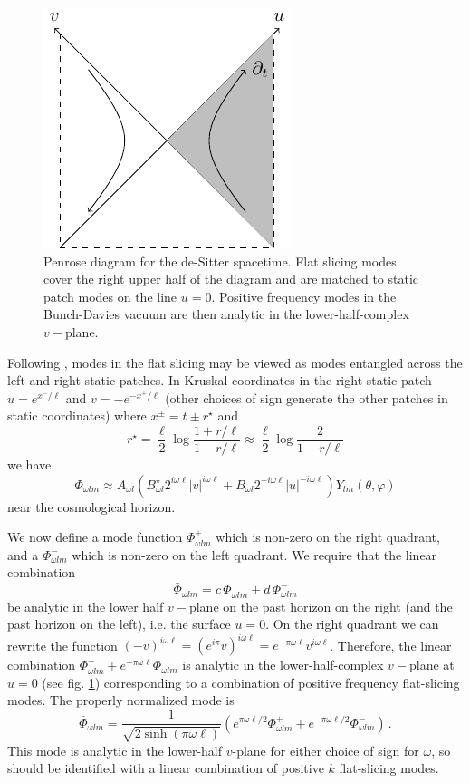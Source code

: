 \documentclass{brownthesis}
\begin{document}
\begin{figure}
\centering
\includegraphics{penrose}\caption{\label{fig:Penrose-diagram-for}Penrose diagram for the de-Sitter spacetime. Flat
slicing modes cover the right upper half of the diagram and are matched
to static patch modes on the line $u=0$. Positive frequency modes
in the Bunch-Davies vacuum are then analytic in the lower-half-complex
$v-$plane.}

\end{figure}

Following \cite{PhysRevD.14.870}, modes in the flat slicing may be viewed
as modes entangled across the left and right static patches. In Kruskal
coordinates in the right static patch $u=e^{x^{-}/\ell}$ and $v=-e^{-x^{+}/\ell}$
(other choices of sign generate the other patches in static coordinates)
where $x^{\pm}=t\pm r^{\star}$ and
\[
r^{\star}=\frac{\ell}{2}\log\frac{1+r/\ell}{1-r/\ell}\approx\frac{\ell}{2}\log\frac{2}{1-r/\ell}
\]
we have
\[
\Phi_{\omega lm}\approx A_{\omega l}(B_{\omega l}^{\star}2^{i\omega\ell}|v|^{i\omega\ell}+B_{\omega l}2^{-i\omega\ell}|u|^{-i\omega\ell})Y_{lm}(\theta,\varphi)
\]
 near the cosmological horizon.

We now define a mode function $\Phi_{\omega lm}^{+}$ which is non-zero
on the right quadrant, and a $\Phi_{\omega lm}^{-}$ which is non-zero
on the left quadrant. We require that the linear combination
\[
\bar{\Phi}_{\omega lm}=c\,\Phi_{\omega lm}^{+}+d\,\Phi_{\omega lm}^{-}
\]
be analytic in the lower half $v-$plane on the past horizon on the
right (and the past horizon on the left), i.e. the surface $u=0$.
On the right quadrant we can rewrite the function $(-v)^{i\omega\ell}=(e^{i\pi}v)^{i\omega\ell}=e^{-\pi\omega\ell}v^{i\omega\ell}$.
Therefore, the linear combination $\Phi_{\omega lm}^{+}+e^{-\pi\omega\ell}\Phi_{\omega lm}^{-}$
is analytic in the lower-half-complex $v-$plane at $u=0$ (see fig.
\ref{fig:Penrose-diagram-for}) corresponding to a combination of
positive frequency flat-slicing modes. The properly normalized mode
is
\begin{equation}
\bar{\Phi}_{\omega lm}=\frac{1}{\sqrt{2\sinh(\pi\omega\ell)}}\left(e^{\pi\omega\ell/2}\Phi_{\omega lm}^{+}+e^{-\pi\omega\ell/2}\Phi_{\omega lm}^{-}\right)\,.\label{eq:entmode}
\end{equation}
This mode is analytic in the lower-half $v$-plane for either choice
of sign for $\omega$, so should be identified with a linear combination
of positive $k$ flat-slicing modes.
\end{document}
